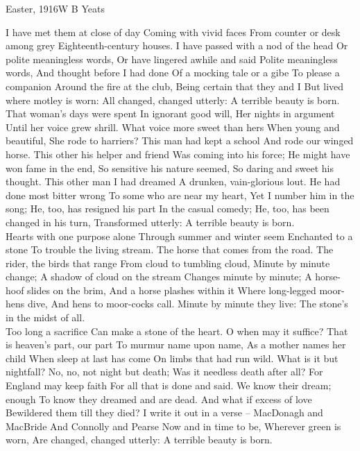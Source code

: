 \begin{poem}{Easter, 1916}{W B Yeats}

I have met them at close of day 
Coming with vivid faces 
From counter or desk among grey 
Eighteenth-century houses. 
I have passed with a nod of the head 
Or polite meaningless words, 
Or have lingered awhile and said 
Polite meaningless words, 
And thought before I had done 
Of a mocking tale or a gibe 
To please a companion 
Around the fire at the club, 
Being certain that they and I 
But lived where motley is worn: 
All changed, changed utterly: 
A terrible beauty is born.\\

That woman's days were spent 
In ignorant good will, 
Her nights in argument 
Until her voice grew shrill. 
What voice more sweet than hers 
When young and beautiful, 
She rode to harriers? 
This man had kept a school 
And rode our winged horse. 
This other his helper and friend 
Was coming into his force; 
He might have won fame in the end, 
So sensitive his nature seemed, 
So daring and sweet his thought. 
This other man I had dreamed 
A drunken, vain-glorious lout. 
He had done most bitter wrong 
To some who are near my heart, 
Yet I number him in the song; 
He, too, has resigned his part 
In the casual comedy; 
He, too, has been changed in his turn, 
Transformed utterly: 
A terrible beauty is born.\\

Hearts with one purpose alone 
Through summer and winter seem 
Enchanted to a stone 
To trouble the living stream. 
The horse that comes from the road. 
The rider, the birds that range 
From cloud to tumbling cloud, 
Minute by minute change; 
A shadow of cloud on the stream 
Changes minute by minute; 
A horse-hoof slides on the brim, 
And a horse plashes within it 
Where long-legged moor-hens dive, 
And hens to moor-cocks call. 
Minute by minute they live: 
The stone's in the midst of all.\\

Too long a sacrifice 
Can make a stone of the heart. 
O when may it suffice? 
That is heaven's part, our part 
To murmur name upon name, 
As a mother names her child 
When sleep at last has come 
On limbs that had run wild. 
What is it but nightfall? 
No, no, not night but death; 
Was it needless death after all? 
For England may keep faith 
For all that is done and said. 
We know their dream; enough 
To know they dreamed and are dead. 
And what if excess of love 
Bewildered them till they died? 
I write it out in a verse -- 
MacDonagh and MacBride 
And Connolly and Pearse 
Now and in time to be, 
Wherever green is worn, 
Are changed, changed utterly: 
A terrible beauty is born. \\
\end{poem}


